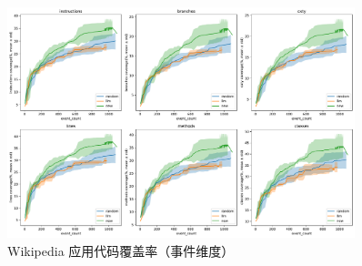 \documentclass[twocolumn, 10pt]{article}
\begin{document}
\begin{figure}[H]
\centering
\includegraphics[width=0.9\textwidth]{org.wikipedia.alpha/coverage_event.pdf}
\caption{Wikipedia 应用代码覆盖率（事件维度）}
\end{figure}
\end{document}
